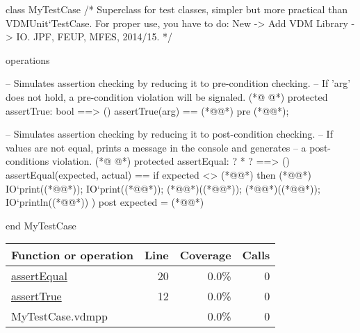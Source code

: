 \begin{vdmpp}[breaklines=true]
class MyTestCase
/*
  Superclass for test classes, simpler but more practical than VDMUnit`TestCase. 
  For proper use, you have to do: New -> Add VDM Library -> IO.
  JPF, FEUP, MFES, 2014/15.
*/

operations

 -- Simulates assertion checking by reducing it to pre-condition checking.
 -- If 'arg' does not hold, a pre-condition violation will be signaled.
(*@
\label{assertTrue:12}
@*)
 protected assertTrue: bool ==> ()
 assertTrue(arg) == 
  (*@@*) 
 pre (*@@*);
  
 -- Simulates assertion checking by reducing it to post-condition checking.
 -- If values are not equal, prints a message in the console and generates 
 -- a post-conditions violation.
(*@
\label{assertEqual:20}
@*)
 protected assertEqual: ? * ? ==> ()
 assertEqual(expected, actual) == 
  if expected <> (*@@*) then (*@\vdmnotcovered{(}@*)
     IO`print((*@@*));
     IO`print((*@@*)); 
     (*@@*)((*@@*));
     (*@@*)((*@@*));
     IO`println((*@@*))
  )
 post expected = (*@@*)
  
end MyTestCase
\end{vdmpp}
\bigskip
\begin{longtable}{|l|r|r|r|}
\hline
Function or operation & Line & Coverage & Calls \\
\hline
\hline
\hyperref[assertEqual:20]{assertEqual} & 20&0.0\% & 0 \\
\hline
\hyperref[assertTrue:12]{assertTrue} & 12&0.0\% & 0 \\
\hline
\hline
MyTestCase.vdmpp & & 0.0\% & 0 \\
\hline
\end{longtable}

